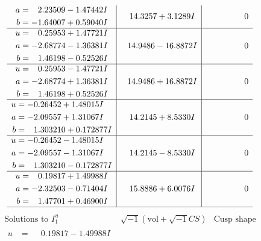 \documentclass[1p]{elsarticle_modified}
\theoremstyle{definition}
\newcommand{\I}{\sqrt{-1}}
\begin{document}
$$\begin{array}{c|c|c}
\begin{aligned}
a &= \phantom{-}2.23509 - 1.47442 I \\
b &= -1.64007 + 0.59040 I\end{aligned}
 & \phantom{-}14.3257 + 3.1289 I & \phantom{-0.000000 } 0 \\ \hline\begin{aligned}
u &= \phantom{-}0.25953 + 1.47721 I \\
a &= -2.68774 - 1.36381 I \\
b &= \phantom{-}1.46198 - 0.52526 I\end{aligned}
 & \phantom{-}14.9486 - 16.8872 I & \phantom{-0.000000 } 0 \\ \hline\begin{aligned}
u &= \phantom{-}0.25953 - 1.47721 I \\
a &= -2.68774 + 1.36381 I \\
b &= \phantom{-}1.46198 + 0.52526 I\end{aligned}
 & \phantom{-}14.9486 + 16.8872 I & \phantom{-0.000000 } 0 \\ \hline\begin{aligned}
u &= -0.26452 + 1.48015 I \\
a &= -2.09557 + 1.31067 I \\
b &= \phantom{-}1.303210 + 0.172877 I\end{aligned}
 & \phantom{-}14.2145 + 8.5330 I & \phantom{-0.000000 } 0 \\ \hline\begin{aligned}
u &= -0.26452 - 1.48015 I \\
a &= -2.09557 - 1.31067 I \\
b &= \phantom{-}1.303210 - 0.172877 I\end{aligned}
 & \phantom{-}14.2145 - 8.5330 I & \phantom{-0.000000 } 0 \\ \hline\begin{aligned}
u &= \phantom{-}0.19817 + 1.49988 I \\
a &= -2.32503 - 0.71404 I \\
b &= \phantom{-}1.47701 + 0.46900 I\end{aligned}
 & \phantom{-}15.8886 + 6.0076 I & \phantom{-0.000000 } 0\\
 \hline 
 \end{array}$$\newpage$$\begin{array}{c|c|c}  
\text{Solutions to }I^u_{1}& \I (\text{vol} + \sqrt{-1}CS) & \text{Cusp shape}\\
 \hline 
\begin{aligned}
u &= \phantom{-}0.19817 - 1.49988 I \\

\end{aligned}
\end{array}$$
\end{document}
